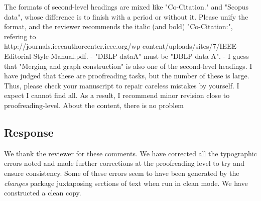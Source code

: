 \documentclass[11pt, oneside]{article}   	%
\begin{document}
The formats of second-level headings are mixed like "Co-Citation." and "Scopus data", whose difference is to finish with a period or without it. Please unify the format, and the reviewer recommends 
the italic (and bold) "Co-Citation:", refering to\\ http://journals.ieeeauthorcenter.ieee.org/wp-content/uploads/sites/7/IEEE-Editorial-Style-Manual.pdf.
- "DBLP dataA" must be "DBLP data A".
- I guess that "Merging and graph construction" is also one of the second-level headings.
I have judged that these are proofreading tasks, but the number of these is large. Thus, please check your manuscript to repair careless mistakes by yourself. I expect I cannot find all.
As a result, I recommend minor revision close to proofreading-level. About the content, there is no problem

\subsection*{Response}

We thank the reviewer for these comments. We have corrected all the typographic errors noted and made further corrections at the proofreading level to try and ensure consistency. Some of these errors 
seem to have been generated by the \emph{changes} package juxtaposing sections of text when run in clean mode. We have constructed a clean copy.

    
\end{document}
